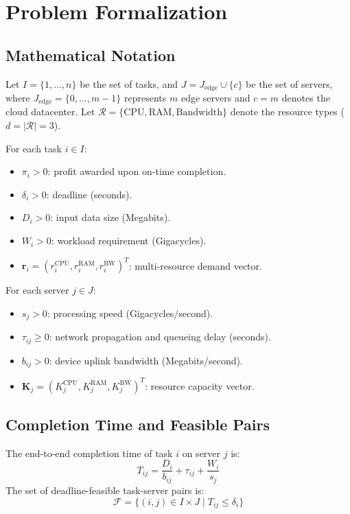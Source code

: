 \documentclass[conference,10pt]{IEEEtran}
\begin{document}
\section{Problem Formalization}
\subsection{Mathematical Notation}
Let $I = \{1, \dots, n\}$ be the set of tasks, and $J = J_{\text{edge}} \cup \{c\}$ be the set of servers, where $J_{\text{edge}} = \{0, \dots, m-1\}$ represents $m$ edge servers and $c = m$ denotes the cloud datacenter. Let $\mathcal{R} = \{\text{CPU}, \text{RAM}, \text{Bandwidth}\}$ denote the resource types ($d = |\mathcal{R}| = 3$).

For each task $i \in I$:
\begin{itemize}
    \item $\pi_i > 0$: profit awarded upon on-time completion.
    \item $\delta_i > 0$: deadline (seconds).
    \item $D_i > 0$: input data size (Megabits).
    \item $W_i > 0$: workload requirement (Gigacycles).
    \item $\mathbf{r}_i = (r_i^{\text{CPU}}, r_i^{\text{RAM}}, r_i^{\text{BW}})^T$: multi-resource demand vector.
\end{itemize}

For each server $j \in J$:
\begin{itemize}
    \item $s_j > 0$: processing speed (Gigacycles/second).
    \item $\tau_{ij} \ge 0$: network propagation and queueing delay (seconds).
    \item $b_{ij} > 0$: device uplink bandwidth (Megabits/second).
    \item $\mathbf{K}_j = (K_j^{\text{CPU}}, K_j^{\text{RAM}}, K_j^{\text{BW}})^T$: resource capacity vector.
\end{itemize}

\subsection{Completion Time and Feasible Pairs}
The end-to-end completion time of task $i$ on server $j$ is:
\begin{equation}
T_{ij} = \frac{D_i}{b_{ij}} + \tau_{ij} + \frac{W_i}{s_j}
\end{equation}
The set of deadline-feasible task-server pairs is:
\begin{equation}
\mathcal{F} = \{(i, j) \in I \times J \mid T_{ij} \le \delta_i\}
\end{equation}
\end{document}

